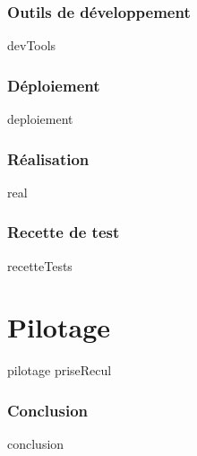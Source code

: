 \documentclass[a4paper, 12pt, titlepage, oneside, french]{article}
\begin{document}
\section{Outils de développement}
{devTools}
\newpage

\section{Déploiement}
{deploiement}
\newpage

\section{Réalisation}
{real}
\newpage

\section{Recette de test}\label{tests}
{recetteTests}
\newpage


\part{Pilotage}
{pilotage}
\newpage
{priseRecul}

\section{Conclusion}
{conclusion}
\newpage

\printglossary[title=Acronymes,type=\acronymtype]
\newpage 
\printglossary~\newpage 
\printbibliography~\newpage
\end{document}
